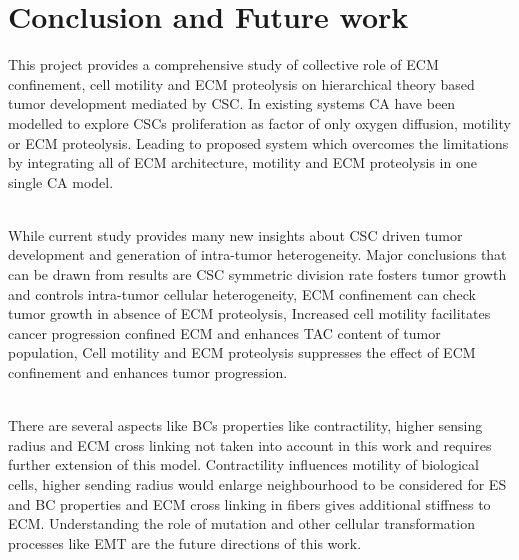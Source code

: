 \chapter*{Conclusion and Future work}

This project provides a comprehensive study of collective role of ECM confinement, 
cell motility and ECM proteolysis on hierarchical theory based tumor development mediated by CSC.
In existing systems CA have been modelled to explore CSCs proliferation as factor of only oxygen diffusion, motility or ECM proteolysis.
Leading to proposed system which overcomes the limitations by integrating all of ECM architecture, motility and ECM proteolysis in one single CA model.\\\

\noindent While current study provides many new insights about CSC driven tumor development and generation of intra-tumor heterogeneity. 
Major conclusions that can be drawn from results are CSC symmetric division rate fosters tumor growth and controls intra-tumor cellular heterogeneity, 
ECM confinement can check tumor growth in absence of ECM proteolysis, 
Increased cell motility facilitates cancer progression confined ECM and enhances TAC content of tumor population, 
Cell motility and ECM proteolysis suppresses the effect of ECM confinement and enhances tumor progression. \\\

\noindent
There are several aspects like BCs properties like contractility, higher sensing radius and ECM cross linking not taken into account in this work 
and requires further extension of this model. Contractility influences motility of biological cells, 
higher sending radius would enlarge neighbourhood to be considered for ES and BC properties and 
ECM cross linking in fibers gives additional stiffness to ECM.
Understanding the role of mutation and other cellular transformation processes like EMT are the future directions of this work.
